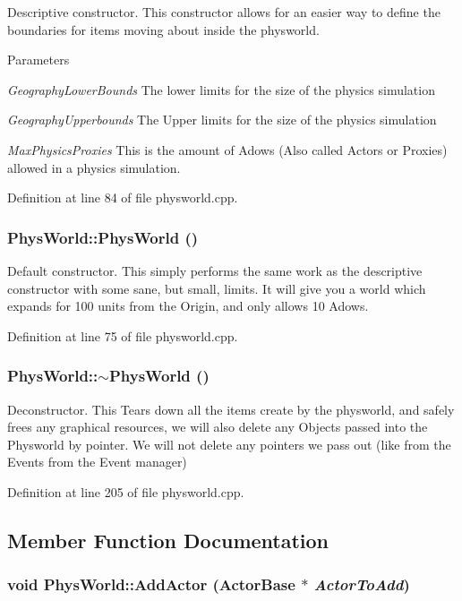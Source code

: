 Descriptive constructor. This constructor allows for an easier way to define the boundaries for items moving about inside the physworld. 
\begin{DoxyParams}{Parameters}
\item[{\em GeographyLowerBounds}]The lower limits for the size of the physics simulation \item[{\em GeographyUpperbounds}]The Upper limits for the size of the physics simulation \item[{\em MaxPhysicsProxies}]This is the amount of Adows (Also called Actors or Proxies) allowed in a physics simulation. \end{DoxyParams}


Definition at line 84 of file physworld.cpp.\hypertarget{classPhysWorld_a6ded8026b0cd72e7877830698197adf0}{
\subsubsection[{PhysWorld}]{\setlength{\rightskip}{0pt plus 5cm}PhysWorld::PhysWorld ()}}
\label{db/df5/classPhysWorld_a6ded8026b0cd72e7877830698197adf0}


Default constructor. This simply performs the same work as the descriptive constructor with some sane, but small, limits. It will give you a world which expands for 100 units from the Origin, and only allows 10 Adows. 

Definition at line 75 of file physworld.cpp.\hypertarget{classPhysWorld_acdfe3b4c1c236860dc7dff945cfe5b07}{
\subsubsection[{$\sim$PhysWorld}]{\setlength{\rightskip}{0pt plus 5cm}PhysWorld::$\sim$PhysWorld ()}}
\label{db/df5/classPhysWorld_acdfe3b4c1c236860dc7dff945cfe5b07}


Deconstructor. This Tears down all the items create by the physworld, and safely frees any graphical resources, we will also delete any Objects passed into the Physworld by pointer. We will not delete any pointers we pass out (like from the Events from the Event manager) 

Definition at line 205 of file physworld.cpp.

\subsection{Member Function Documentation}
\hypertarget{classPhysWorld_ae490054b3e1c4c5aa69cb8e3b7bd2f29}{
\subsubsection[{AddActor}]{\setlength{\rightskip}{0pt plus 5cm}void PhysWorld::AddActor ({\bf ActorBase} $\ast$ {\em ActorToAdd})}}
\label{db/df5/classPhysWorld_ae490054b3e1c4c5aa69cb8e3b7bd2f29}


